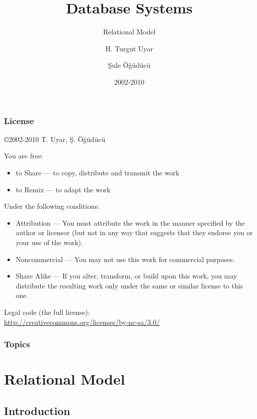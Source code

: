 \documentclass[dvipsnames]{beamer}
\title{Database Systems}
\subtitle{Relational Model}
\author{H. Turgut Uyar \and \c{S}ule \"{O}\u{g}\"{u}d\"{u}c\"{u}}
\date{2002-2010}
\theoremstyle{plain}
\begin{document}
\begin{frame}
  \titlepage
\end{frame}

\begin{frame}
  \frametitle{License}

  \hfill
  \copyright 2002-2010 T. Uyar, Ş. Öğüdücü

  \vfill
  \begin{tiny}
    You are free:
    \begin{itemize}
      \item to Share — to copy, distribute and transmit the work
      \item to Remix — to adapt the work
    \end{itemize}

    Under the following conditions:
    \begin{itemize}
      \item Attribution — You must attribute the work in the manner specified by
        the author or licensor (but not in any way that suggests that they
        endorse you or your use of the work).

      \item Noncommercial — You may not use this work for commercial purposes.

      \item Share Alike — If you alter, transform, or build upon this work, you
        may distribute the resulting work only under the same or similar license
        to this one.
    \end{itemize}
  \end{tiny}

  \vfill
  Legal code (the full license):\\
  \url{http://creativecommons.org/licenses/by-nc-sa/3.0/}
\end{frame}

\begin{frame}
  \frametitle{Topics}
  \tableofcontents
\end{frame}

\section{Relational Model}

\subsection{Introduction}
\end{document}
